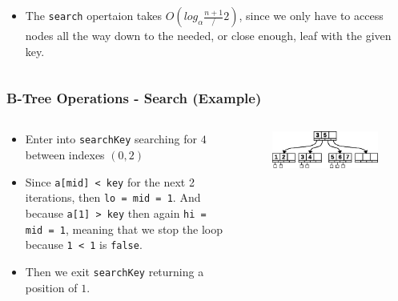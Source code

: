 \documentclass{beamer}
\begin{document}
\begin{frame}[t,allowframebreaks]
\begin{columns}
\begin{column}{\textlecolumn}
\begin{block}{}
\begin{itemize}
                    \item The \lstinline|search| opertaion takes \(O\left(log_\alpha \frac{n + 1}/2\right)\), since we only have to access nodes all the way down to the needed, or close enough, leaf with the given key.
                \end{itemize}
            \end{block}
        \end{column}
        \begin{column}{\textricolumn}
        \end{column}
    \end{columns}
    \btreeSearchKey
\end{frame}
\begin{frame}
    \frametitle{B-Tree Operations - Search (Example)}
    \begin{columns}
        \begin{column}{.45\textwidth}
            \vspace{-2cm}
            \begin{block}{}
                \begin{itemize}
                    \item Enter into \lstinline|searchKey| searching for \(4\) between indexes \(\left(0, 2\right)\)
                    \item Since \lstinline|a[mid] < key| for the next 2 iterations, then \lstinline|lo = mid = 1|. And because \lstinline|a[1] > key| then again \lstinline|hi = mid = 1|, meaning that we stop the loop because \lstinline|1 < 1| is \lstinline|false|.
                    \item Then we exit \lstinline|searchKey| returning a position of \(1\).
                \end{itemize}
            \end{block}
        \end{column}
        \begin{column}{.6\textwidth}
            \vspace{-1cm}
            \begin{block}{}
                \begin{figure}[h!]
                    \includegraphics[width=\linewidth]{resources/made/a4_b_tree.eps}
                \end{figure}    
                \btreeSearchStepOne
            \end{block}
        \end{column}
    \end{columns}
\end{frame}
\end{document}
